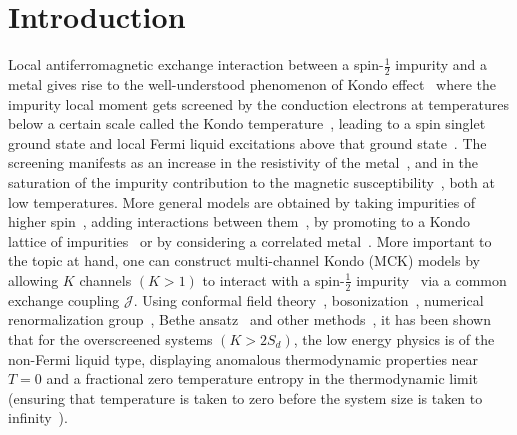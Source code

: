 \documentclass[reprint,prb,superscriptaddress]{revtex4-2}
\begin{document}
\section{Introduction}
{\color{blue}
Local antiferromagnetic exchange interaction between a spin-\(\frac{1}{2}\) impurity and a metal gives rise to the well-understood phenomenon of Kondo effect~\cite{hewson1993} where the impurity local moment gets screened by the conduction electrons at temperatures below a certain scale called the Kondo temperature~\cite{anderson1969exact,anderson1970exact,anderson1970,wilson1975,andreiKondoreview,tsvelickKondoreview,affleck1993exact,affleck1995conformal}, leading to a spin singlet ground state and local Fermi liquid excitations above that ground state~\cite{nozieres1974fermi,hewsonp}.
The screening manifests as an increase in the resistivity of the metal~\cite{Kondo,Zhang2013}, and in the saturation of the impurity contribution to the magnetic susceptibility~\cite{wilson1975,andreiKondoreview,tsvelickKondoreview}, both at low temperatures.
More general models are obtained by taking impurities of higher spin~\cite{hewson1993,Noz_blandin_1980,affleck1993exact}, adding interactions between them~\cite{affleck_1992,affleck_ludwig_jones_1992,georges_1999,zarand_chung_2006,mitchell_logan_2011,mitchell_sela_2012,konig_coleman_2021}, by promoting to a Kondo lattice of impurities~\cite{coleman_1987,millis_lee_1987,auerbach_1986,rice_ueda_1986,stewart_1984} or by considering a correlated metal~\cite{granath_1998}.
More important to the topic at hand, one can construct multi-channel Kondo (MCK) models by allowing \(K\) channels \( \left(K > 1\right) \) to interact with a spin-\(\frac{1}{2}\) impurity~\cite{Noz_blandin_1980,zawadowski_1980,cox_zawadowski_1998} via a common exchange coupling \(\mathcal{J}\).
Using conformal field theory~\cite{affleck_1991_overscreen,affleck_ludwig_1991,affleck_pang_cox_1992,affleck1993exact,parcollet_olivier_large_N,affleck_2005}, bosonization~\cite{emery_kivelson,clarke_giamarchi_1993,zarand_2000,vondelft_prl_1998,schofield_1997}, numerical renormalization group~\cite{bullaNRGreview,affleck_pang_cox_1992,pang_cox_1991}, Bethe ansatz~\cite{andrei_destri_1984,Tsvelick1984,Tsvelick_1985,andrei_jerez_1995,zarand_costi_2002} and other methods~\cite{sengupta_1994,fabrizio_nozieres_1995,Coleman_tsvelik,fabrizio_gogolin_1995}, it has been shown that for the overscreened systems \(\left(K > 2S_d\right)\), the low energy physics is of the non-Fermi liquid type, displaying anomalous thermodynamic properties near \(T=0\) and a fractional zero temperature entropy in the thermodynamic limit (ensuring that temperature is taken to zero before the system size is taken to infinity~\cite{rozhkov_1998,vondelft_prl_1998}).
}
\end{document}
